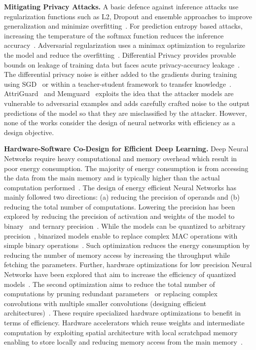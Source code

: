 \noindent\textbf{Mitigating Privacy Attacks.} A basic defence against inference attacks use regularization functions such as L2, Dropout and ensemble approaches to improve generalization and minimize overfitting~\cite{salem2018ml,shokri2017membership}.
For prediction entropy based attacks, increasing the temperature of the softmax function reduces the inference accuracy~\cite{shokri2017membership}.
Adversarial regularization uses a minimax optimization to regularize the model and reduce the overfitting~\cite{DBLP:conf/ccs/NasrSH18}.
Differential Privacy provides provable bounds on leakage of training data but faces acute privacy-accuracy leakage~\cite{236254}.
The differential privacy noise is either added to the gradients during training using SGD~\cite{Abadi:2016:DLD:2976749.2978318} or within a teacher-student framework to transfer knowledge~\cite{papernot2016semi}.
AttriGuard~\cite{217523} and Memguard~\cite{10.1145/3319535.3363201} exploits the idea that the attacker models are vulnerable to adversarial examples and adds carefully crafted noise to the output predictions of the model so that they are misclassified by the attacker.
However, none of the works consider the design of neural networks with efficiency as a design objective.

\noindent\textbf{Hardware-Software Co-Design for Efficient Deep Learning.} Deep Neural Networks require heavy computational and memory overhead which result in poor energy consumption.
The majority of energy consumption is from accessing the data from the main memory and is typically higher than the actual computation performed~\cite{6757323}.
The design of energy efficient Neural Networks has mainly followed two directions: (a) reducing the precision of operands and (b) reducing the total number of computations.
Lowering the precision has been explored by reducing the precision of activation and weights of the model to binary~\cite{NIPS2015_5647, NIPS2016_6573} and ternary precision~\cite{Li2016TernaryWN,DBLP:journals/corr/ZhuHMD16}.
While the models can be quantized to arbitrary precision~\cite{Hubara:2017:QNN:3122009.3242044}, binarized models enable to replace complex MAC operations with simple binary operations~\cite{rastegari2016xnornet,DBLP:journals/corr/ZhouNZWWZ16}.
Such optimization reduces the energy consumption by reducing the number of memory access by increasing the throughput while fetching the parameters.
Further, hardware optimizations for low precision Neural Networks have been explored that aim to increase the efficiency of quantized models~\cite{AndCav2016YodaNN,Umuroglu2017FINNAF}.
The second optimization aims to reduce the total number of computations by pruning redundant parameters~\cite{Han:2015:LBW:2969239.2969366} or replacing complex convolutions with multiple smaller convolutions (designing efficient architectures)~\cite{conf/cvpr/SandlerHZZC18,46505,eccv_2018_yang_netadapt,DBLP:journals/corr/IandolaMAHDK16}.
These require specialized hardware optimizations to benefit in terms of efficiency.
Hardware accelerators which reuse weights and intermediate computation by exploiting spatial architecture with local scratchpad memory enabling to store locally and reducing memory access from the main memory~\cite{7551407,10.1109/ISCA.2016.30}.


